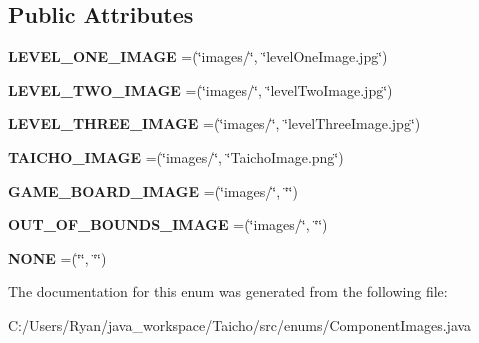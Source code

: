 \subsection*{Public Attributes}
\begin{DoxyCompactItemize}
\item 
\hypertarget{enumenums_1_1_component_images_ad6f0a77843482c6816282c258458527d}{{\bfseries L\-E\-V\-E\-L\-\_\-\-O\-N\-E\-\_\-\-I\-M\-A\-G\-E} =(\char`\"{}images/\char`\"{}, \char`\"{}level\-One\-Image.\-jpg\char`\"{})}\label{enumenums_1_1_component_images_ad6f0a77843482c6816282c258458527d}

\item 
\hypertarget{enumenums_1_1_component_images_a01819b08a6ff909761ef79b18bb62020}{{\bfseries L\-E\-V\-E\-L\-\_\-\-T\-W\-O\-\_\-\-I\-M\-A\-G\-E} =(\char`\"{}images/\char`\"{}, \char`\"{}level\-Two\-Image.\-jpg\char`\"{})}\label{enumenums_1_1_component_images_a01819b08a6ff909761ef79b18bb62020}

\item 
\hypertarget{enumenums_1_1_component_images_a1d57dac0d6a520e039550a6d3904256a}{{\bfseries L\-E\-V\-E\-L\-\_\-\-T\-H\-R\-E\-E\-\_\-\-I\-M\-A\-G\-E} =(\char`\"{}images/\char`\"{}, \char`\"{}level\-Three\-Image.\-jpg\char`\"{})}\label{enumenums_1_1_component_images_a1d57dac0d6a520e039550a6d3904256a}

\item 
\hypertarget{enumenums_1_1_component_images_a3cf7f9ff7f166fee162212ef24954054}{{\bfseries T\-A\-I\-C\-H\-O\-\_\-\-I\-M\-A\-G\-E} =(\char`\"{}images/\char`\"{}, \char`\"{}Taicho\-Image.\-png\char`\"{})}\label{enumenums_1_1_component_images_a3cf7f9ff7f166fee162212ef24954054}

\item 
\hypertarget{enumenums_1_1_component_images_a09471e8d5cd1bc8de7a31fb8c3769cd8}{{\bfseries G\-A\-M\-E\-\_\-\-B\-O\-A\-R\-D\-\_\-\-I\-M\-A\-G\-E} =(\char`\"{}images/\char`\"{}, \char`\"{}\char`\"{})}\label{enumenums_1_1_component_images_a09471e8d5cd1bc8de7a31fb8c3769cd8}

\item 
\hypertarget{enumenums_1_1_component_images_adc01366b74087a127f1b3076f7df7faf}{{\bfseries O\-U\-T\-\_\-\-O\-F\-\_\-\-B\-O\-U\-N\-D\-S\-\_\-\-I\-M\-A\-G\-E} =(\char`\"{}images/\char`\"{}, \char`\"{}\char`\"{})}\label{enumenums_1_1_component_images_adc01366b74087a127f1b3076f7df7faf}

\item 
\hypertarget{enumenums_1_1_component_images_a651a449c0886cea62ca209094c616014}{{\bfseries N\-O\-N\-E} =(\char`\"{}\char`\"{}, \char`\"{}\char`\"{})}\label{enumenums_1_1_component_images_a651a449c0886cea62ca209094c616014}

\end{DoxyCompactItemize}


The documentation for this enum was generated from the following file\-:\begin{DoxyCompactItemize}
\item 
C\-:/\-Users/\-Ryan/java\-\_\-workspace/\-Taicho/src/enums/Component\-Images.\-java\end{DoxyCompactItemize}
